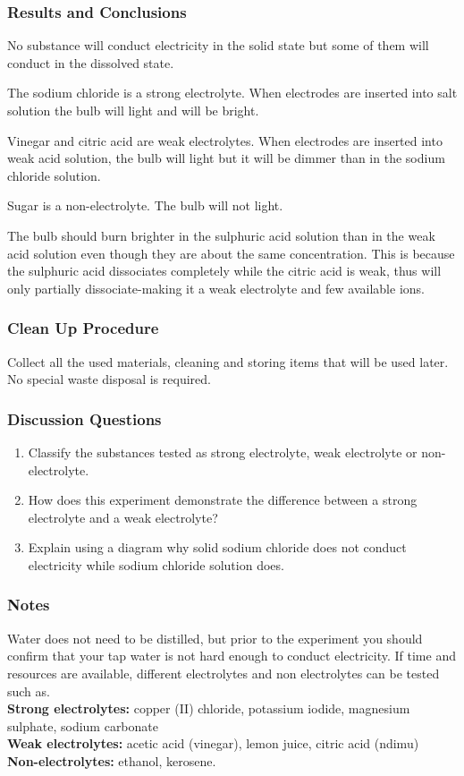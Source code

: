 \subsubsection*{Results and Conclusions}
No substance will conduct electricity in the solid state but some of them will conduct in the dissolved state.

The sodium chloride is a strong electrolyte. When electrodes are inserted into salt solution the bulb will light and will be bright.

Vinegar and citric acid are weak electrolytes. When electrodes are inserted into weak acid solution, the bulb will light but it will be dimmer than in the sodium chloride solution.

Sugar is a non-electrolyte. The bulb will not light.

The bulb should burn brighter in the sulphuric acid solution than in the weak acid solution even though they are about the same concentration. This is because the sulphuric acid dissociates completely while the citric acid is weak, thus will only partially dissociate-making it a weak electrolyte and few available ions.

\subsubsection*{Clean Up Procedure}
Collect all the used materials, cleaning and storing items that will be used later. No special waste disposal is required.

\subsubsection*{Discussion Questions}
\begin{enumerate}
\item{Classify the substances tested as strong electrolyte, weak electrolyte or non-electrolyte.}
\item{How does this experiment demonstrate the difference between a strong electrolyte and a weak electrolyte?}
\item{Explain using a diagram why solid sodium chloride does not conduct electricity while sodium chloride solution does.}
\end{enumerate}

\subsubsection*{Notes}
Water does not need to be distilled, but prior to the experiment you should confirm that your tap water is not hard enough to conduct electricity.
If time and resources are available, different electrolytes and non electrolytes can be tested such as.\\
\textbf{Strong electrolytes:} copper (II) chloride, potassium iodide, magnesium sulphate, sodium carbonate\\
\textbf{Weak electrolytes:} acetic acid (vinegar), lemon juice, citric acid (ndimu)\\
\textbf{Non-electrolytes:} ethanol, kerosene.

